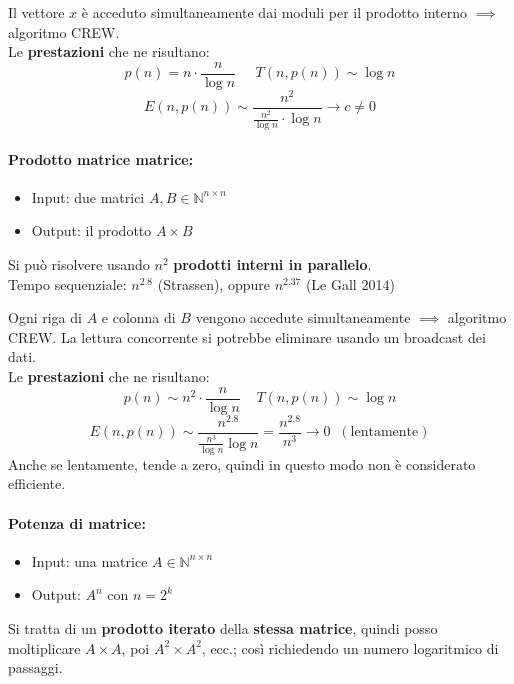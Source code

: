Il vettore $x$ è acceduto simultaneamente dai moduli per il prodotto interno $\implies$ algoritmo CREW.\\

Le \textbf{prestazioni} che ne risultano: 
$$ p(n) = n \cdot \frac{n}{\log n} \;\;\;\;\; T(n, p(n)) \sim \log n $$
$$ E (n, p(n)) \sim \frac{n^2}{\frac{n^2}{\log n} \cdot \log n} \rightarrow c \neq 0$$

\newpage

\paragraph{Prodotto matrice matrice:} 
\begin{itemize}
	\item Input: due matrici $A,B \in \mathbb{N}^{n \times n}$
	\item Output: il prodotto $A \times B$
\end{itemize}

Si può risolvere usando $n^2$ \textbf{prodotti interni in parallelo}.\\

Tempo sequenziale: $n^{2.8}$ (Strassen), oppure $n^{2.37}$ (Le Gall 2014)

Ogni riga di $A$ e colonna di $B$ vengono accedute simultaneamente $\implies$ algoritmo CREW. La lettura concorrente si potrebbe eliminare usando un broadcast dei dati.\\

Le \textbf{prestazioni} che ne risultano: 
$$ p(n) \sim n^2 \cdot \frac{n}{\log n} \;\;\;\; T(n, p(n)) \sim \log n $$
$$ E(n, p(n)) \sim \frac{n^{2.8}}{\frac{n^3}{\log n} \log n} = \frac{n^{2.8}}{n^3} \rightarrow 0 \;\;(\text{lentamente}) $$ 
Anche se lentamente, tende a zero, quindi in questo modo non è considerato efficiente.\\

\newpage

\paragraph{Potenza di matrice:}
\begin{itemize}
	\item Input: una matrice $A \in \mathbb{N}^{n \times n}$
	\item Output: $A^n$ con $n = 2^k$
\end{itemize}

Si tratta di un \textbf{prodotto iterato} della \textbf{stessa matrice}, quindi posso moltiplicare $A \times A$, poi $A^2 \times A^2$, ecc.; così richiedendo un numero logaritmico di passaggi.\\


